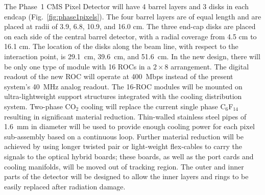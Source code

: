 The Phase~1 CMS Pixel Detector will have 4 barrel layers and 3 disks
in each endcap (Fig.~\ref{fig:phase1pixels}). The four barrel layers
are of equal length and are placed at radii of 3.9, 6.8, 10.9, and
16.0 cm. The three end-cap disks are placed on each side of the
central barrel detector, with a radial coverage from 4.5 cm to 16.1
cm.  The location of the disks along the beam line, with respect to
the interaction point, is 29.1~cm, 39.6~cm, and 51.6~cm. In the new
design, there will be only one type of module with 16 ROCs in a
$2\times 8$ arrangement. The digital readout of the new ROC will
operate at 400~Mbps instead of the present system's 40~MHz analog
readout. The 16-ROC modules will be mounted on ultra-lightweight
support structures integrated with the cooling distribution
system. Two-phase CO$_2$ cooling will replace the current single phase
C$_6$F$_{14}$ resulting in significant material reduction. Thin-walled
stainless steel pipes of 1.6~mm in diameter will be used to provide
enough cooling power for each pixel sub-assembly based on a continuous
loop. Further material reduction will be achieved by using longer
twisted pair or light-weight flex-cables to carry the signals to the
optical hybrid boards; these boards, as well as the port cards and
cooling manifolds, will be moved out of tracking region. The outer and
inner parts of the detector will be designed to allow the inner layers
and rings to be easily replaced after radiation damage.




